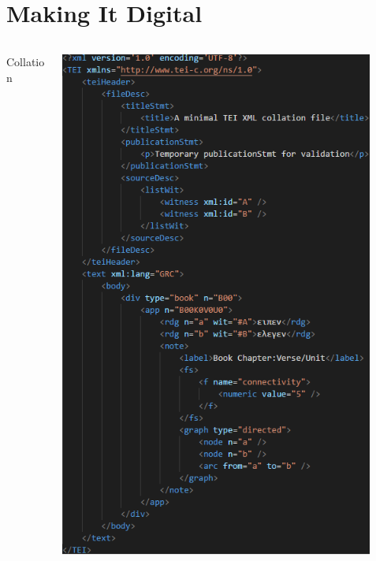 \documentclass[10pt]{beamer}
\begin{document}
	\section*{Making It Digital}
	\begin{frame}
		\begin{columns}
			\begin{column}{0.55\textwidth}
				\begin{center}
					Collation
				\end{center}
			\end{column}
			\begin{column}{0.4\textwidth}
				\includegraphics[width=0.9\textwidth]{../img/collation-xml.png}
			\end{column}
		\end{columns}
	\end{frame}
\end{document}
